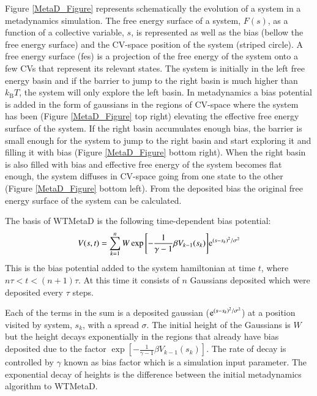Figure \ref{MetaD_Figure} represents schematically the evolution of a system in a metadynamics 
simulation. The free energy surface of a system, $F(s)$, as a function of 
a collective variable, $s$, is represented as well as the bias (bellow the free energy surface) and 
the CV-space position of the system (striped circle). A free energy surface (\gls{fes}) is a 
projection of the free energy of the system onto a few CVs that represent its relevant states. 
The system is initially in the left free energy basin and if the barrier to jump to the right 
basin is much higher than $k_\text{B}T$, the system will only explore the left basin. In 
metadynamics 
a bias potential is added in the form of gaussians in the regions of CV-space where the system 
has been (Figure \ref{MetaD_Figure} top right) elevating the effective free energy surface of 
the system. If the right basin accumulates enough bias, the barrier is small enough for the 
system to jump to the right basin and start exploring it and filling it with bias (Figure 
\ref{MetaD_Figure} bottom right). When the right basin is also filled with bias and effective 
free energy of the system becomes flat enough, the system diffuses in CV-space going from one 
state to the other (Figure \ref{MetaD_Figure} bottom left). From the deposited bias the 
original free energy surface of the system can be calculated.

The basis of WTMetaD is the following time-dependent bias potential:
\begin{equation}\label{bias}
V(s,t)=\sum^{n}_{k=1}W
\exp{\left[-\frac{1}{\gamma-1}\beta V_{k-1}(s_k) \right]}
\mathrm{e}^{\left(s-s_k\right)^2/\sigma^2}
\end{equation}
This is the bias potential added to the system hamiltonian at time $t$, where 
$n\tau<t<(n+1)\tau$. At this time it consists of $n$ Gaussians deposited which were deposited 
every 
$\tau$ steps. 

Each of the terms in the sum is a deposited gaussian ($\mathrm{e}^{\left(s-s_k\right)^2/\sigma^2}$) at 
a 
position visited by system, $s_k$, with a spread $\sigma$. The initial height of the Gaussians is 
$W$ but the height decays exponentially in the regions that already have bias deposited due to the 
factor $\exp{\left[-\frac{1}{\gamma-1}\beta V_{k-1}(s_k) \right]}$. The rate of decay is controlled 
by $\gamma$ known as bias factor which is a simulation input parameter. The exponential decay of 
heights is the difference between the initial metadynamics algorithm to WTMetaD.

